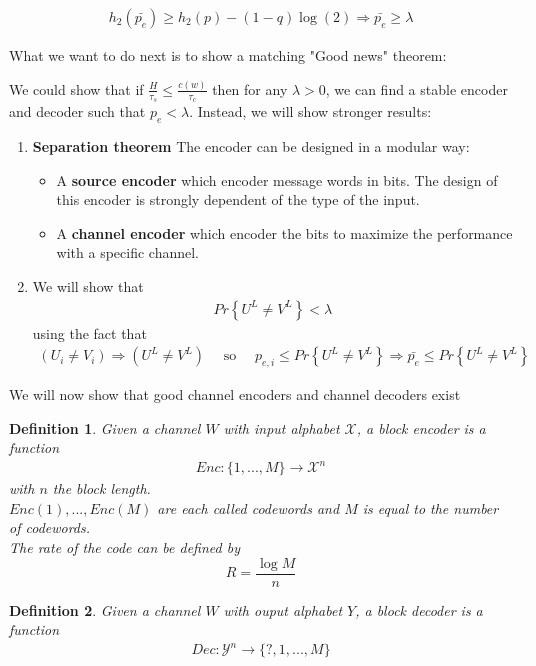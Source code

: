 \documentclass{article}
\newtheorem{definition}{Definition}[section]
\theoremstyle{definition} %
\renewcommand{\Pr}[1]{Pr\left\{#1\right\}}
\def\X{\mathcal{X}}
\def\Y{\mathcal{Y}}
\begin{document}
\begin{align*}
  h_2(\bar{p_e}) \geq h_2(p) - (1 - q)\log(2) \Rightarrow \bar{p_e} \geq \lambda
\end{align*}

What we want to do next is to show a matching "Good news" theorem:

We could show that if $\frac{H}{\tau_s} \leq \frac{c(w)}{\tau_c}$ then for any $\lambda > 0$, we can find a stable encoder and decoder such that $p_e < \lambda$.
Instead, we will show stronger results:
\begin{enumerate}
  \item \textbf{Separation theorem}
    The encoder can be designed in a modular way:
    \begin{itemize}
      \item A \textbf{source encoder} which encoder message words in bits. The design of this encoder is strongly dependent of the type of the input.
      \item A \textbf{channel encoder} which encoder the bits to maximize the performance with a specific channel.
    \end{itemize}
  \item We will show that
  \begin{align*}
    \Pr{U^L \neq V^L} < \lambda
  \end{align*}
  using the fact that
  \begin{align*}
    (U_i \neq V_i) \Rightarrow (U^L \neq V^L)
    \quad \text{ so } \quad
    p_{e,i} \leq \Pr{U^L \neq V^L} \Rightarrow \bar{p_e} \leq \Pr{U^L \neq V^L}
  \end{align*}
\end{enumerate}

We will now show that good channel encoders and channel decoders exist

\begin{definition}
  Given a channel $W$ with input alphabet $\X$, a block encoder is a function
  \begin{align*}
    Enc: \{1, ..., M\} \rightarrow \X^n
  \end{align*}
  with $n$ the block length.\\
  $Enc(1), ..., Enc(M)$ are each called codewords and $M$ is equal to the number of codewords.\\
  The rate of the code can be defined by
  $$ R = \frac{\log M}{n} $$
\end{definition}
\begin{definition}
  Given a channel $W$ with ouput alphabet $Y$, a block decoder is a function
  \begin{align*}
    Dec: \Y^n \rightarrow \{ ?, 1, ..., M\}
  \end{align*}
\end{definition}
\end{document}
